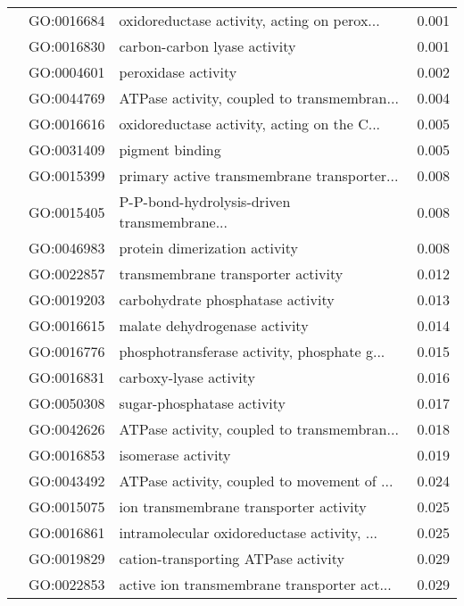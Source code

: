 \begin{longtable}{lllr}
   & GO:0016684 &  oxidoreductase activity, acting on perox... &         0.001 \\
   & GO:0016830 &                 carbon-carbon lyase activity &         0.001 \\
   & GO:0004601 &                          peroxidase activity &         0.002 \\
   & GO:0044769 &  ATPase activity, coupled to transmembran... &         0.004 \\
   & GO:0016616 &  oxidoreductase activity, acting on the C... &         0.005 \\
   & GO:0031409 &                              pigment binding &         0.005 \\
   & GO:0015399 &  primary active transmembrane transporter... &         0.008 \\
   & GO:0015405 &  P-P-bond-hydrolysis-driven transmembrane... &         0.008 \\
   & GO:0046983 &                protein dimerization activity &         0.008 \\
   & GO:0022857 &           transmembrane transporter activity &         0.012 \\
   & GO:0019203 &            carbohydrate phosphatase activity &         0.013 \\
   & GO:0016615 &                malate dehydrogenase activity &         0.014 \\
   & GO:0016776 &  phosphotransferase activity, phosphate g... &         0.015 \\
   & GO:0016831 &                       carboxy-lyase activity &         0.016 \\
   & GO:0050308 &                   sugar-phosphatase activity &         0.017 \\
   & GO:0042626 &  ATPase activity, coupled to transmembran... &         0.018 \\
   & GO:0016853 &                           isomerase activity &         0.019 \\
   & GO:0043492 &  ATPase activity, coupled to movement of ... &         0.024 \\
   & GO:0015075 &       ion transmembrane transporter activity &         0.025 \\
   & GO:0016861 &  intramolecular oxidoreductase activity, ... &         0.025 \\
   & GO:0019829 &          cation-transporting ATPase activity &         0.029 \\
   & GO:0022853 &  active ion transmembrane transporter act... &         0.029 \\

\end{longtable}
